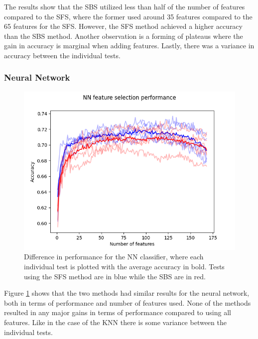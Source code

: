 \documentclass{kththesis}
\begin{document}
The results show that the SBS utilized less than half of the number of features compared to the SFS, where the former used around 35 features compared to the 65 features for the SFS. However, the SFS method achieved a higher accuracy than the SBS method. Another observation is a forming of plateaus where the gain in accuracy is marginal when adding features. Lastly, there was a variance in accuracy between the individual tests.

\newpage

\subsubsection{Neural Network}

\begin{figure}[h!]
  \begin{center}
    \includegraphics[scale=0.8]{../new_plots/nn_graph.png}
    \caption{Difference in performance for the NN classifier, where each individual test is plotted with the average accuracy in bold. Tests using the SFS method are in blue while the SBS are in red.}
    \label{fig:nn}  %
  \end{center}
\end{figure}

Figure \ref{fig:nn} shows that the two methods had similar results for the neural network, both in terms of performance and number of features used. None of the methods resulted in any major gains in terms of performance compared to using all features. Like in the case of the KNN there is some variance between the individual tests.
\end{document}
